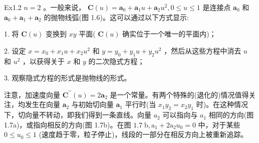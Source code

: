 \documentclass[../main.tex]{subfiles}
\begin{document}
Ex1.2 \(n = 2\) 。一般来说， \(\mathbf{C}\left( u\right)  = {\mathbf{a}}_{0} + {\mathbf{a}}_{1}u + {\mathbf{a}}_{2}{u}^{2},0 \leq  u \leq  1\) 是连接点 \({\mathbf{a}}_{0}\) 和 \({\mathbf{a}}_{0} + {\mathbf{a}}_{1} + {\mathbf{a}}_{2}\) 的抛物线弧(图 1.6)。这可以通过以下方式显示:

1. 将 \(\mathbf{C}\left( u\right)\) 变换到 \({xy}\) 平面( \(\mathbf{C}\left( u\right)\) 确实位于一个唯一的平面内)；

2. 设定 \(x = {x}_{0} + {x}_{1}u + {x}_{2}{u}^{2}\) 和 \(y = {y}_{0} + {y}_{1}u + {y}_{2}{u}^{2}\) ，然后从这些方程中消去 \(u\) 和 \({u}^{2}\) ，以获得关于 \(x\) 和 \(y\) 的二次隐式方程；

3. 观察隐式方程的形式是抛物线的形式。

注意，加速度向量 \({\mathbf{C}}^{\prime \prime }\left( u\right)  = 2{\mathbf{a}}_{2}\) 是一个常量。有两个特殊的(退化的)情况值得关注，均发生在向量 \({\mathbf{a}}_{2}\) 与初始切向量 \({\mathbf{a}}_{1}\) 平行时(当 \({x}_{1}{y}_{2} = {x}_{2}{y}_{1}\) 时)。在这种情况下，切向量不转动，即我们得到一条直线。向量 \({a}_{2}\) 可以指向与 \({a}_{1}\) 相同的方向(图 1.7a)，或指向相反的方向(图 1.7b)。在图 \({1.7}\mathrm{\;b},{\mathrm{a}}_{1} + 2{\mathrm{a}}_{2}{u}_{0} = 0\) 中，对于某些 \(0 \leq  {u}_{0} \leq  1\) (速度趋于零，粒子停止)，线段的一部分在相反方向上被重新追踪。

\begin{center}
\begin{minipage}{14cm}
\centering
{}
\captionsetup{font=small,justification=centering,singlelinecheck=false,skip=6pt}
\end{minipage}
\end{center}

\begin{center}
\begin{minipage}{14cm}
\centering
{}
\captionsetup{font=small,justification=centering,singlelinecheck=false,skip=6pt}
\end{minipage}
\end{center}



\begin{center}
\begin{minipage}{14cm}
\centering
{}
\captionsetup{font=small,justification=centering,singlelinecheck=false,skip=6pt}
\end{minipage}
\end{center}
\end{document}
